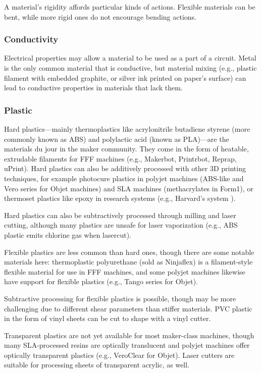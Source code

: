 A material's rigidity affords particular kinds of actions. Flexible materials can be bent, while more rigid ones do not encourage bending actions.

\subsubsection{Conductivity}

Electrical properties may allow a material to be used as a part of a circuit. Metal is the only common material that is conductive, but material mixing (e.g., plastic filament with embedded graphite, or silver ink printed on paper's surface) can lead to conductive properties in materials that lack them.

\subsubsection{Plastic}

Hard plastics---mainly thermoplastics like acrylonitrile butadiene styrene (more commonly known as ABS) and polylactic acid (known as PLA)---are the materials du jour in the maker community. They come in the form of heatable, extrudable filaments for FFF machines (e.g., Makerbot, Printrbot, Reprap, uPrint). Hard plastics can also be additively processed with other 3D printing techniques, for example photocure plastics in polyjet machines (ABS-like and Vero series for Objet machines) and SLA machines (methacrylates in Form1), or thermoset plastics like epoxy in research systems (e.g., Harvard's system \cite{compton-epoxy}).

Hard plastics can also be subtractively processed through milling and laser cutting, although many plastics are unsafe for laser vaporization (e.g., ABS plastic emits chlorine gas when lasercut).

Flexible plastics are less common than hard ones, though there are some notable materials here: thermoplastic polyurethane (sold as Ninjaflex) is a filament-style flexible material for use in FFF machines, and some polyjet machines likewise have support for flexible plastics (e.g., Tango series for Objet).

Subtractive processing for flexible plastics is possible, though may be more challenging due to different shear parameters than stiffer materials. PVC plastic in the form of vinyl sheets can be cut to shape with a vinyl cutter.

Transparent plastics are not yet available for most maker-class machines, though many SLA-processed resins are optically translucent and polyjet machines offer optically transparent plastics (e.g., VeroClear for Objet). Laser cutters are suitable for processing sheets of transparent acrylic, as well.

